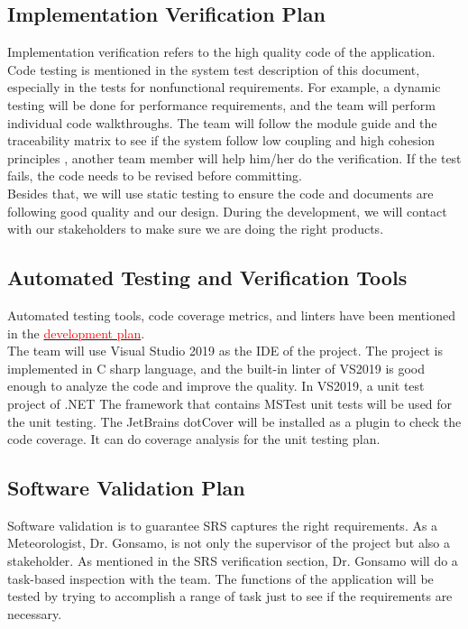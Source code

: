 \documentclass[12pt, titlepage]{article}
\begin{document}
\subsection{Implementation Verification Plan}
Implementation verification refers to the high quality code of the application. Code
testing is mentioned in the system test description of this document, especially in
the tests for nonfunctional requirements. For example, a dynamic testing will be done
for performance requirements, and the team will perform individual code
walkthroughs. The team will follow the module guide and the traceability matrix to see
if the system follow low coupling and high cohesion principles
, another team member will help him/her do the
verification.
If the test fails, the code needs to be revised
before committing.\\
\noindent
Besides that, we will use static testing to ensure the code and documents are following good quality and our design. During the development, we will contact with our stakeholders to make sure we are doing the right products.

\subsection{Automated Testing and Verification Tools}

Automated testing tools, code coverage metrics, and linters have been mentioned in the
\href{https://github.com/wuj187/DigitalTwinCAS/blob/main/docs/DevelopmentPlan/DevelopmentPlan.pdf}{\textcolor{red}{development plan}}. \\
The team will use Visual Studio 2019 as the IDE of the project. The project is
implemented in C sharp language, and the built-in linter of VS2019 is good enough to
analyze the code and improve the quality. In VS2019, a unit test project of .NET
The framework that contains MSTest unit tests will be used for the unit testing. The
JetBrains dotCover will be installed as a plugin to check the code coverage. It can do
coverage analysis for the unit testing plan.

\subsection{Software Validation Plan}
Software validation is to guarantee SRS captures the right requirements.  As a
Meteorologist, Dr. Gonsamo, is not only the supervisor of the project but also a
stakeholder. As mentioned in the SRS verification section, Dr. Gonsamo will do a task-based inspection with the team. The functions of the application will be tested by trying to accomplish a range of task just to see if the requirements are necessary.
\end{document}
